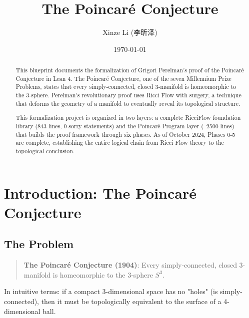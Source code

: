 
\title{The Poincaré Conjecture}
\author{Xinze Li (李昕泽)}
\date{\today}

\maketitle

\begin{abstract}
This blueprint documents the formalization of Grigori Perelman's proof of the Poincaré Conjecture in Lean 4. The Poincaré Conjecture, one of the seven Millennium Prize Problems, states that every simply-connected, closed 3-manifold is homeomorphic to the 3-sphere. Perelman's revolutionary proof uses Ricci Flow with surgery, a technique that deforms the geometry of a manifold to eventually reveal its topological structure.

This formalization project is organized in two layers: a complete RicciFlow foundation library (843 lines, 0 sorry statements) and the Poincaré Program layer (~2500 lines) that builds the proof framework through six phases. As of October 2024, Phases 0-5 are complete, establishing the entire logical chain from Ricci Flow theory to the topological conclusion.
\end{abstract}

\tableofcontents

\chapter{Introduction: The Poincaré Conjecture}
\label{chap:introduction}

\section{The Problem}

\begin{quote}
\textbf{The Poincaré Conjecture (1904)}: Every simply-connected, closed 3-manifold is homeomorphic to the 3-sphere $S^3$.
\end{quote}

In intuitive terms: if a compact 3-dimensional space has no "holes" (is simply-connected), then it must be topologically equivalent to the surface of a 4-dimensional ball.

